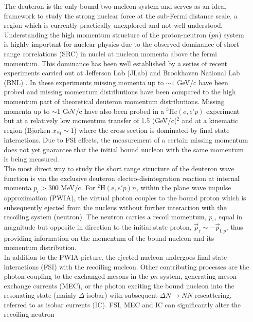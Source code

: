 \documentclass[aps,prl,twocolumn,showpacs,superscriptaddress,groupedaddress]{revtex4-2}  %
\begin{document}
The deuteron is the only bound two-nucleon system and serves as an ideal framework to study the strong nuclear force at the sub-Fermi distance scale, a region which is currently
practically unexplored and not well understood. Understanding the high momentum structure of the proton-neutron ($pn$) system is highly important for nuclear physics due to the observed 
dominance of short-range correlations (SRC) in nuclei at nucleon momenta above the fermi momentum. This dominance has been well established by a series of recent experiments
carried out at Jefferson Lab (JLab) \cite{Subedi1476, PhysRevLett.113.022501,PhysRevLett.122.172502, Schmidt_2020} and Brookhaven National Lab (BNL) \cite{PhysRevLett.97.162504}. In these experiments missing momenta up to $\sim1$ GeV/c have been probed and missing momentum distributions
have been compared to the high momentum part of theoretical deuteron momentum distributions.
Missing momenta up to $\sim1$ GeV/c have also been probed in a $^{3}\mathrm{He}(e,e'p)$ experiment \cite{PhysRevLett.94.082305,PhysRevLett.94.192302} but at a relatively low momentum transfer of 1.5 (GeV/c)$^{2}$ and at a kinematic region
(Bjorken $x_{\mathrm{Bj}}\sim1$) where the cross section is dominated by final state interactions. Due to FSI effects, the measurement of a certain missing momentum does not yet guarantee that the initial
bound nucleon with the same momentum is being measured.\\
\indent The most direct way to study the short range structure of the deuteron wave function
is via the exclusive deuteron electro-disintegration reaction at internal momenta $p_{\mathrm{r}}>300$ MeV/c. For $^{2}\mathrm{H}(e,e'p)n$, within the plane wave impulse approximation (PWIA),
the virtual photon couples to the bound proton which is subsequently ejected from the nucleus without further interaction with the recoiling system (neutron). The neutron carries a recoil
momentum, $p_{\mathrm{r}}$, equal in magnitude but opposite in direction to the initial state proton, $\vec{p}_{\mathrm{r}} \sim -\vec{p}_{\mathrm{i},p}$, thus providing information on the momentum
of the bound nucleon and its momentum distribution.\\
\indent In addition to the PWIA picture, the ejected nucleon undergoes final state interactions (FSI) with the recoiling nucleon. Other contributing processes are
the photon coupling to the exchanged mesons in the $pn$ system, generating meson exchange currents (MEC), or the photon exciting the bound nucleon into the
resonating state (mainly $\Delta$-isobar) with subsequent $\Delta N \to NN$ rescattering, referred to as isobar currents (IC). FSI, MEC and IC can significantly alter the recoiling neutron
\end{document}
